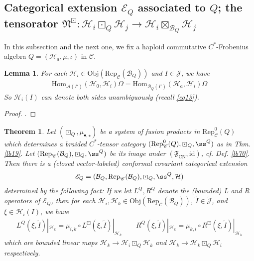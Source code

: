 \documentclass[11pt,b5paper,notitlepage]{article}
\theoremstyle{definition}
\theoremstyle{plain}
\newtheorem{thm}[df]{Theorem}
\newtheorem{lm}[df]{Lemma}
\newcommand{\fk}{\mathfrak}
\newcommand{\mc}{\mathcal}
\newcommand{\wtd}{\widetilde}
\newcommand{\id}{\mathrm{id}}
\newcommand{\Hom}{\mathrm{Hom}}
\newcommand{\Rep}{\mathrm{Rep}}
\newcommand{\scr}{\mathscr}
\newcommand{\Jtd}{\widetilde{\mathcal J}}
\newcommand{\blt}{\bullet}
\newcommand{\Obj}{\mathrm{Obj}}
\newcommand{\CN}{{\scriptscriptstyle \mathrm{CN}}}
\numberwithin{equation}{section}
\begin{document}
\subsection{Categorical extension $\scr E_Q$ associated to $Q$; the tensorator $\fk N^\boxdot:\mc H_i\boxdot_Q\mc H_j\rightarrow\mc H_i\boxtimes_{\mc B_Q}\mc H_j$}\label{lb40}

In this subsection and the next one, we fix a haploid commutative $C^*$-Frobenius algebra $Q=(\mc H_a,\mu,\iota)$ in $\scr C$. %


\begin{lm}
For each $\mc H_i\in\Obj(\Rep_{\scr C}(\mc B_Q))$ and $I\in\mc J$, we have
\begin{align*}
\Hom_{\mc A(I')}(\mc H_0,\mc H_i)\Omega=\Hom_{\mc B_Q(I')}(\mc H_a,\mc H_i)\Omega
\end{align*}
So $\mc H_i(I)$ can denote both sides unambiguously (recall \eqref{eq13}). 
\end{lm}

\begin{proof}
\cite[Lem. 5.8]{Gui21c}.
\end{proof}


\begin{thm}\label{lb21}
Let $(\boxdot_Q,\mu_{\blt,\star})$ be a system of fusion products in $\Rep^0_{\scr C}(Q)$ which determines a braided $C^*$-tensor category $(\Rep^0_{\scr C}(Q),\boxdot_Q,\ss^Q)$ as in Thm. \ref{lb19}. Let $(\Rep_{\scr C}(\mc B_Q),\boxdot_Q,\ss^Q)$ be its image under $(\fk F_\CN,\id)$, cf. Def. \ref{lb70}. Then there is a (closed vector-labeled) conformal covariant categorical extension
\begin{align*}
\scr E_Q=(\mc B_Q,\Rep_{\scr C}(\mc B_Q),\boxdot_Q,\ss^Q,\mc H)
\end{align*}
determined by the following fact: If we let $L^Q,R^Q$ denote the (bounded) L and R operators of $\scr E_Q$, then for each $\mc H_i,\mc H_k\in\Obj(\Rep_{\scr C}(\mc B_Q))$, $\wtd I\in\Jtd$, and $\xi\in\mc H_i(I)$, we have
\begin{gather}\label{eq63}
L^Q(\xi,\wtd I)|_{\mc H_k}=\mu_{i,k}\circ L^\boxdot(\xi,\wtd I)|_{\mc H_k}\qquad R^Q(\xi,\wtd I)|_{\mc H_k}=\mu_{k,i}\circ R^\boxdot(\xi,\wtd I)|_{\mc H_k}
\end{gather}
which are bounded linear maps $\mc H_k\rightarrow\mc H_i\boxdot_Q\mc H_k$ and $\mc H_k\rightarrow\mc H_k\boxdot_Q\mc H_i$ respectively.
\end{thm}
\end{document}

